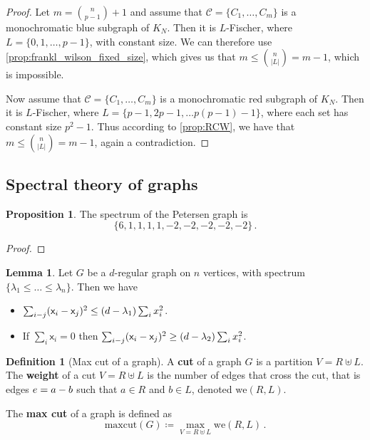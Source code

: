 \documentclass[12pt]{amsart}
\theoremstyle{definition}
\newtheorem{prop}[thm]{Proposition}
\newtheorem{lm}[thm]{Lemma}
\newtheorem{defin}[thm]{Definition}
\newcommand{\CC}{\mathcal C}
\newcommand{\vx}{\mathsf{x}}
\newcommand{\maxcut}{\mathrm{maxcut}}
\newcommand{\we}{\mathrm{we}}
\begin{document}
\begin{proof}
Let $m = \binom{n}{p-1} + 1$ and assume that $\CC = \{C_1, \ldots, C_m\}$ is a monochromatic blue subgraph of $K_N$.
Then it is $L$-Fischer, where $L = \{0, 1, \ldots, p-1\}$, with constant size.
We can therefore use \cref{prop:frankl_wilson_fixed_size}, which gives us that $m \leq \binom{n}{|L|} = m -1$, which is impossible.

Now assume that $\CC = \{ C_1, \ldots,  C_m\}$ is a monochromatic red subgraph of $K_N$.
Then it is $L$-Fischer, where $L = \{p-1, 2p-1, \ldots p(p-1) - 1\}$, where each set has constant size $p^2-1$.
Thus according to \cref{prop:RCW}, we have that $m \leq \binom{n}{|L|} = m-1$, again a contradiction.
\end{proof}


\subsection{Spectral theory of graphs}

\begin{prop}
The spectrum of the Petersen graph is 
$$ \{ 6, 1, 1, 1, 1, -2, -2, -2, -2, -2 \} \, .$$
\end{prop}

\begin{proof}

\end{proof}



\begin{lm}
Let $G$ be a $d$-regular graph on $n$ vertices, with spectrum $\{ \lambda_1 \leq \ldots \leq \lambda_n\}$.
Then we have
\begin{itemize}
\item $\sum_{i \-- j} (\vx_i - \vx_j)^2 \leq (d - \lambda_1)\sum_i x_i^2$.

\item If $\sum_i \vx_i = 0$ then $\sum_{i \-- j} (\vx_i - \vx_j)^2 \geq (d - \lambda_2)\sum_i x_i^2$.
\end{itemize}
\end{lm}


\begin{defin}[Max cut of a graph]
A \textbf{cut} of a graph $G$ is a partition $V = R \uplus L$.
The \textbf{weight} of a cut $V = R \uplus L$ is the number of edges that cross the cut, that is edges $e = a \-- b$ such that $a \in R$ and $b \in L$, denoted $\we(R, L)$.

The \textbf{max cut} of a graph is defined as
$$ \maxcut (G) \coloneqq \max_{V = R \uplus L} \we(R, L) \, . $$
\end{defin}
\end{document}
